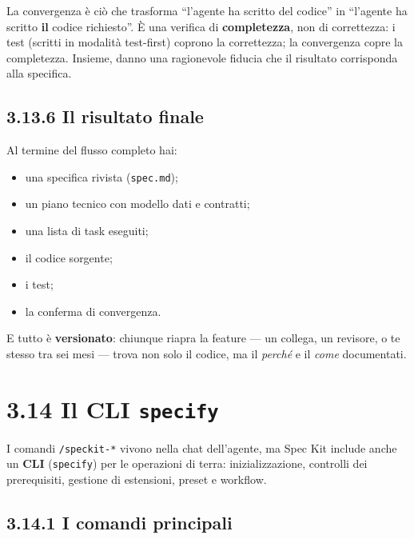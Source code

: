 \documentclass[
  italian,
  10pt,
]{book}
\providecommand{\tightlist}{%
  \setlength{\itemsep}{0pt}\setlength{\parskip}{0pt}}
\begin{document}
La convergenza è ciò che trasforma ``l'agente ha scritto del codice'' in
``l'agente ha scritto \textbf{il} codice richiesto''. È una verifica di
\textbf{completezza}, non di correttezza: i test (scritti in modalità
test-first) coprono la correttezza; la convergenza copre la completezza.
Insieme, danno una ragionevole fiducia che il risultato corrisponda alla
specifica.

\subsection{3.13.6 Il risultato finale}\label{il-risultato-finale}

Al termine del flusso completo hai:

\begin{itemize}
\tightlist
\item
  una specifica rivista (\texttt{spec.md});
\item
  un piano tecnico con modello dati e contratti;
\item
  una lista di task eseguiti;
\item
  il codice sorgente;
\item
  i test;
\item
  la conferma di convergenza.
\end{itemize}

E tutto è \textbf{versionato}: chiunque riapra la feature --- un
collega, un revisore, o te stesso tra sei mesi --- trova non solo il
codice, ma il \emph{perché} e il \emph{come} documentati.

\section{\texorpdfstring{3.14 Il CLI
\texttt{specify}}{3.14 Il CLI specify}}\label{il-cli-specify}

I comandi \texttt{/speckit-*} vivono nella chat dell'agente, ma Spec Kit
include anche un \textbf{CLI} (\texttt{specify}) per le operazioni di
terra: inizializzazione, controlli dei prerequisiti, gestione di
estensioni, preset e workflow.

\subsection{3.14.1 I comandi principali}\label{i-comandi-principali}
\end{document}
